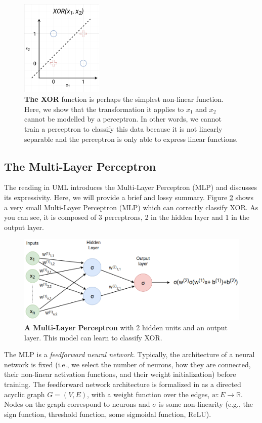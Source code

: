 \documentclass{article}
\begin{document}
\begin{figure}[H]
    \centering
    \includegraphics[width=0.35\textwidth]{figures/xor_non_linsep.png}
    \caption{\textbf{The XOR} function is perhaps the simplest non-linear function. Here, we show that the transformation it applies to $x_1$ and $x_2$ cannot be modelled by a perceptron. In other words, we cannot train a perceptron to classify this data because it is not linearly separable and the perceptron is only able to express linear functions.}
    \label{fig:XOR}
\end{figure}

\subsection{The Multi-Layer Perceptron}
The reading in UML \citep{Shalev-Shwartz:2014:UML:2621980} introduces the Multi-Layer Perceptron (MLP) and discusses its expressivity. Here, we will provide a brief and lossy summary. Figure \ref{fig:nn} shows a very small Multi-Layer Perceptron (MLP) which can correctly classify XOR. As you can see, it is composed of 3 perceptrons, 2 in the hidden layer and 1 in the output layer.

\begin{figure}[H]
    \centering
    \includegraphics[width=.8\textwidth]{figures/nn.png}
    \caption{\textbf{A Multi-Layer Perceptron} with 2 hidden units and an output layer. This model can learn to classify XOR. }
    \label{fig:nn}
\end{figure}

The MLP is a \textit{feedforward neural network}. Typically, the architecture of a neural network is fixed (i.e., we select the number of neurons, how they are connected, their non-linear activation functions, and their weight initialization) before training. The feedforward network architecture is formalized in \citep{Shalev-Shwartz:2014:UML:2621980} as a directed acyclic graph $G = (V, E)$, with a weight function over the edges, $w: E \to \mathbb{R}$. Nodes on the graph correspond to neurons and $\sigma$ is some non-linearity (e.g., the sign function, threshold function, some sigmoidal function, ReLU).
\end{document}
